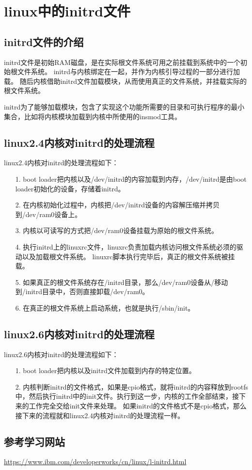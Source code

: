\documentclass[a4paper,left=2.5cm,right=2.5cm,11pt]{article}
\begin{document}

\clearpage

\section{linux中的initrd文件}
\subsection{initrd文件的介绍}
	initrd文件是初始RAM磁盘，是在实际根文件系统可用之前挂载到系统中的一个初始根文件系统。
	initrd与内核绑定在一起，并作为内核引导过程的一部分进行加载。
	随后内核借助initrd文件加载模块，从而使用真正的文件系统，并挂载实际的根文件系统。\par

	initrd为了能够加载模块，包含了实现这个功能所需要的目录和可执行程序的最小集合，比如将内核模块加载到内核中所使用的insmod工具。

\subsection{linux2.4内核对initrd的处理流程}
	linux2.4内核对initrd的处理流程如下：
	\begin{itemize}
		\item[1.] boot loader把内核以及/dev/initrd的内容加载到内存，/dev/initrd是由boot loader初始化的设备，存储着initrd。
		\item[2.] 在内核初始化过程中，内核把/dev/initrd设备的内容解压缩并拷贝到/dev/ram0设备上。
		\item[3.] 内核以可读写的方式把/dev/ram0设备挂载为原始的根文件系统。
		\item[4.] 执行initrd上的linuxrc文件，linuxrc负责加载内核访问根文件系统必须的驱动以及加载根文件系统。
				  linuxrc脚本执行完毕后，真正的根文件系统被挂载。
		\item[5.] 如果真正的根文件系统存在/initrd目录，那么/dev/ram0设备从/移动到/initrd目录中，否则直接卸载/dev/ram0。
		\item[6.] 在真正的根文件系统上启动系统，也就是执行/sbin/init。
	\end{itemize}

\subsection{linux2.6内核对initrd的处理流程}
	linux2.6内核对initrd的处理流程如下：
	\begin{itemize}
		\item[1.] boot loader把内核以及initrd文件加载到内存的特定位置。
		\item[2.] 内核判断initrd的文件格式，如果是cpio格式，就将initrd的内容释放到rootfs中，然后执行initrd中的init文件。执行到这一步，内核的工作全部结束，接下来的工作完全交给init文件来处理。
		          如果initrd的文件格式不是cpio格式，那么接下来的流程就和linux2.4内核对initrd的处理流程一样。
	\end{itemize}

\subsection{参考学习网站}
	\url{https://www.ibm.com/developerworks/cn/linux/l-initrd.html}
\end{document}
